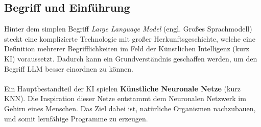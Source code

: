 \subsection{Begriff und Einführung}
Hinter dem simplen Begriff \textit{Large Language Model} (engl. Großes Sprachmodell) steckt eine komplizierte Technologie mit großer Herkunftsgeschichte, welche eine Definition mehrerer Begrifflichkeiten im Feld der Künstlichen Intelligenz (kurz KI) voraussetzt. Dadurch kann ein Grundverständnis geschaffen werden, um den Begriff LLM besser einordnen zu können. \cite{seemannKuenstlicheIntelligenzLarge} \\\\ Ein Hauptbestandteil der KI spielen \textbf{Künstliche Neuronale Netze} (kurz \acs{KNN}). 
Die Inspiration dieser Netze entstammt dem Neuronalen Netzwerk im Gehirn eines Menschen. \cite*{seemannKuenstlicheIntelligenzLarge} Das Ziel dabei ist, natürliche Organismen nachzubauen, und somit lernfähige Programme zu erzeugen. 
